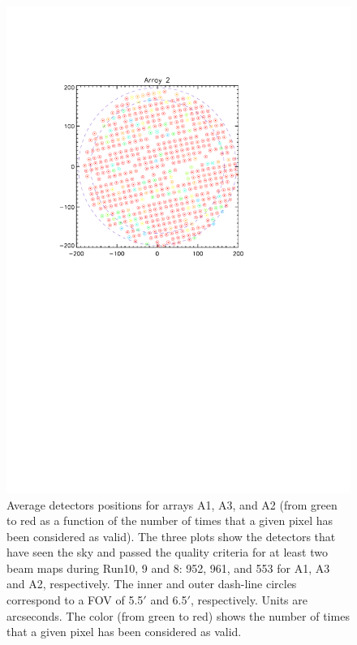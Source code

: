 \begin{figure}[p]
\begin{center}
\includegraphics[scale=0.1]{Figures/A2_fwhm_color_count.pdf}
\caption{Average detectors positions for arrays A1, A3, and A2 (from
  green to red as a function of the number of times that a given pixel
  has been considered as valid). The three plots show the detectors
  that have seen the sky and passed the quality criteria for at least
  two beam maps during Run10, 9 and 8: 952, 961, and 553
  for A1, A3 and A2, respectively. The inner and outer dash-line circles correspond to a FOV of 5.5$\prime$ and 6.5$\prime$, respectively. Units are arcseconds. The color (from green to red)  shows the number of times that a given pixel has been considered as valid.}
\label{fig:avg_fov_color}
\end{center}
\end{figure}

